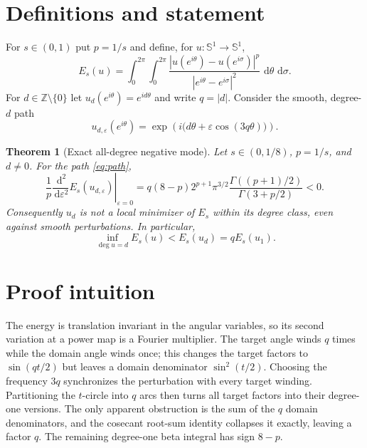 \documentclass[11pt]{article}
\newtheorem{theorem}{Theorem}
\newcommand{\Sone}{\mathbb S^1}
\newcommand{\dd}{\,\mathrm d}
\begin{document}
\section{Definitions and statement}

For $s\in(0,1)$ put $p=1/s$ and define, for $u:\Sone\to\Sone$,
\begin{equation}\label{eq:energy}
 E_s(u)=\int_0^{2\pi}\!\int_0^{2\pi}
 \frac{|u(e^{i\theta})-u(e^{i\sigma})|^p}
 {|e^{i\theta}-e^{i\sigma}|^2}\,\dd\theta\,\dd\sigma.
\end{equation}
For $d\in\mathbb Z\setminus\{0\}$ let $u_d(e^{i\theta})=e^{id\theta}$ and
write $q=|d|$.  Consider the smooth, degree-$d$ path
\begin{equation}\label{eq:path}
 u_{d,\varepsilon}(e^{i\theta})
 =\exp\!\left(i\bigl(d\theta+\varepsilon\cos(3q\theta)\bigr)\right).
\end{equation}

\begin{theorem}[Exact all-degree negative mode]\label{thm:main}
Let $s\in(0,1/8)$, $p=1/s$, and $d\ne0$.  For the path
\eqref{eq:path},
\begin{equation}\label{eq:exact-second}
 \left.\frac1p\frac{\dd^2}{\dd\varepsilon^2}
 E_s(u_{d,\varepsilon})\right|_{\varepsilon=0}
 =q(8-p)2^{p+1}\pi^{3/2}
 \frac{\Gamma((p+1)/2)}{\Gamma(3+p/2)}<0.
\end{equation}
Consequently $u_d$ is not a local minimizer of $E_s$ within its degree class,
even against smooth perturbations.  In particular,
\[
 \inf_{\deg u=d}E_s(u)<E_s(u_d)=qE_s(u_1).
\]
\end{theorem}

\section{Proof intuition}

The energy is translation invariant in the angular variables, so its second
variation at a power map is a Fourier multiplier.  The target angle winds
$q$ times while the domain angle winds once; this changes the target factors
to $\sin(qt/2)$ but leaves a domain denominator $\sin^2(t/2)$.  Choosing the
frequency $3q$ synchronizes the perturbation with every target winding.
Partitioning the $t$-circle into $q$ arcs then turns all target factors into
their degree-one versions.  The only apparent obstruction is the sum of the
$q$ domain denominators, and the cosecant root-sum identity collapses it
exactly, leaving a factor $q$.  The remaining degree-one beta integral has
sign $8-p$.
\end{document}
